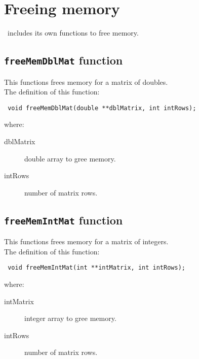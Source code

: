 \section{Freeing memory} \label{sec:freeingMemory}

\BI\ includes its own functions to free memory.

\subsection{\texttt{freeMemDblMat} function} \label{sec:freeMemDblMat}

This functions frees memory for a matrix of doubles.\\

The definition of this function:
%
\begin{verbatim}
 void freeMemDblMat(double **dblMatrix, int intRows);
\end{verbatim}
%
where:
%
\begin{description}
\item[dblMatrix] double array to gree memory.
\item[intRows] number of matrix rows.
\end{description}

\subsection{\texttt{freeMemIntMat} function} \label{sec:freeMemIntMat}

This functions frees memory for a matrix of integers.\\

The definition of this function:
%
\begin{verbatim}
 void freeMemIntMat(int **intMatrix, int intRows);
\end{verbatim}
%
where:
%
\begin{description}
\item[intMatrix] integer array to gree memory.
\item[intRows] number of matrix rows.
\end{description}

